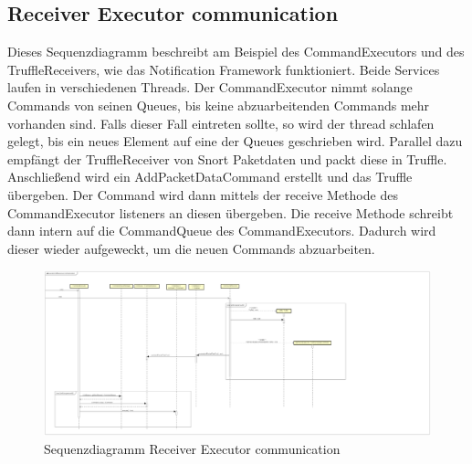 \subsection{Receiver Executor communication}

Dieses Sequenzdiagramm beschreibt am Beispiel des CommandExecutors und des TruffleReceivers, wie das Notification Framework funktioniert.
Beide Services laufen in verschiedenen Threads. Der CommandExecutor nimmt solange Commands von seinen Queues, bis keine abzuarbeitenden
Commands mehr vorhanden sind. Falls dieser Fall eintreten sollte, so wird der thread schlafen gelegt, bis ein neues Element auf eine
der Queues geschrieben wird. Parallel dazu empfängt der TruffleReceiver von Snort Paketdaten und packt diese in Truffle. Anschließend
wird ein AddPacketDataCommand erstellt und das Truffle übergeben. Der Command wird dann mittels der receive Methode des CommandExecutor listeners
an diesen übergeben. Die receive Methode schreibt dann intern auf die CommandQueue des CommandExecutors. Dadurch wird dieser wieder aufgeweckt,
um die neuen Commands abzuarbeiten.

\begin{figure}[H]
  \centering
  \includegraphics[width=\textwidth]{../diagramimages/sd_receiver_executor_comm.png}
  \caption[Sequenzdiagramm Receiver Executor communication]{Sequenzdiagramm Receiver Executor communication}
\end{figure}